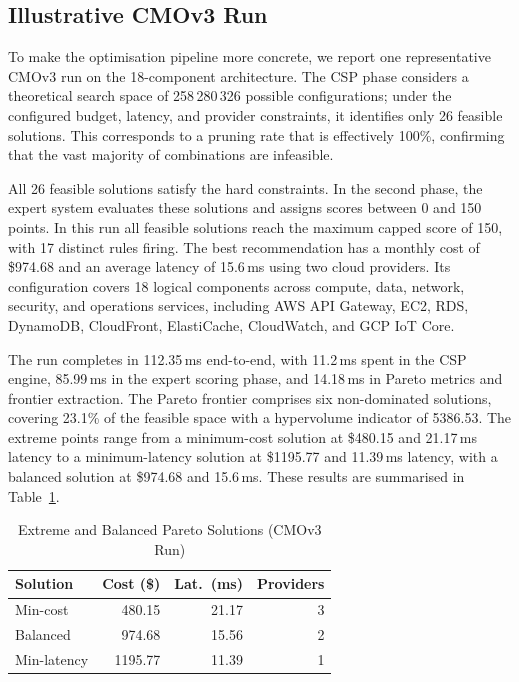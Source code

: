 \documentclass[journal]{IEEEtran}
\newcommand{\cmothree}{CMOv3\xspace}
\begin{document}
\subsection{Illustrative CMOv3 Run}
\label{sec:cmov3run}

To make the optimisation pipeline more concrete, we report one representative
\cmothree run on the 18-component architecture. The CSP phase considers a
theoretical search space of 258\,280\,326 possible configurations; under the
configured budget, latency, and provider constraints, it identifies only 26
feasible solutions. This corresponds to a pruning rate that is effectively
100\%, confirming that the vast majority of combinations are infeasible.

All 26 feasible solutions satisfy the hard constraints. In the second phase, the
expert system evaluates these solutions and assigns scores between 0 and 150
points. In this run all feasible solutions reach the maximum capped score of
150, with 17 distinct rules firing. The best recommendation has a monthly cost
of \$974.68 and an average latency of 15.6\,ms using two cloud providers. Its
configuration covers 18 logical components across compute, data, network,
security, and operations services, including AWS API Gateway, EC2, RDS,
DynamoDB, CloudFront, ElastiCache, CloudWatch, and GCP IoT Core.

The run completes in 112.35\,ms end-to-end, with 11.2\,ms spent in the CSP
engine, 85.99\,ms in the expert scoring phase, and 14.18\,ms in Pareto metrics
and frontier extraction. The Pareto frontier comprises six non-dominated
solutions, covering 23.1\% of the feasible space with a hypervolume indicator
of 5386.53. The extreme points range from a minimum-cost solution at \$480.15
and 21.17\,ms latency to a minimum-latency solution at \$1195.77 and 11.39\,ms
latency, with a balanced solution at \$974.68 and 15.6\,ms. These results are
summarised in Table~\ref{tab:cmov3}.

\begin{table}[t]
\centering
\caption{Extreme and Balanced Pareto Solutions (CMOv3 Run)}
\label{tab:cmov3}
\begin{tabular}{@{}lrrr@{}}
\toprule
Solution     & Cost (\$) & Lat.\ (ms) & Providers \\
\midrule
Min-cost     &  480.15   & 21.17      & 3         \\
Balanced     &  974.68   & 15.56      & 2         \\
Min-latency  & 1195.77   & 11.39      & 1         \\
\bottomrule
\end{tabular}
\end{table}
\end{document}
